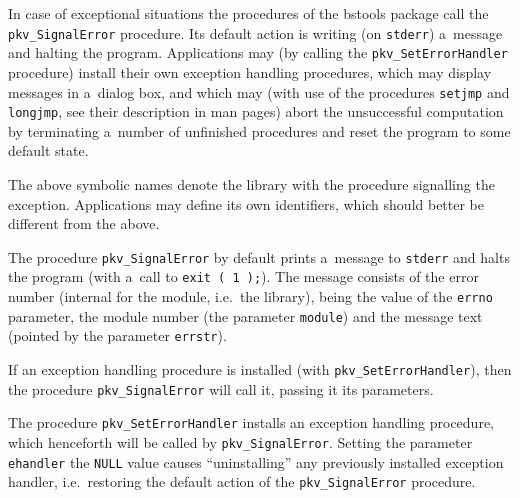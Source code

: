 In case of exceptional situations the procedures of the bstools package
call the \texttt{pkv\_SignalError} procedure. Its default action is
writing (on \texttt{stderr}) a~message and halting the program.
Applications may (by calling the \texttt{pkv\_SetErrorHandler} procedure)
install their own exception handling procedures, which may display
messages in a~dialog box, and which may (with use of the procedures
\texttt{setjmp} and \texttt{longjmp}, see their description in man pages)
abort the unsuccessful computation by terminating a~number of unfinished
procedures and reset the program to some default state.

\vspace{\bigskipamount}
The above symbolic names denote the library with the procedure signalling
the exception. Applications may define its own identifiers, which should
better be different from the above.

\vspace{\bigskipamount}
The procedure \texttt{pkv\_SignalError} by default prints a~message
to \texttt{stderr} and halts the program (with a~call to
\texttt{exit~(~1~);}). The message consists of the error number
(internal for the module, i.e.\ the library), being the value of
the \texttt{errno} parameter, the module number (the parameter
\texttt{module}) and the message text (pointed by the parameter
\texttt{errstr}).

If an exception handling procedure is installed (with
\texttt{pkv\_SetErrorHandler}), then the procedure
\texttt{pkv\_SignalError} will call it, passing it its parameters.

\vspace{\bigskipamount}
\begin{sloppypar}
The procedure \texttt{pkv\_SetErrorHandler} installs an exception handling
procedure, which henceforth will be called by \texttt{pkv\_SignalError}.
Setting the parameter \texttt{ehandler} the \texttt{NULL} value
causes ``uninstalling'' any previously installed exception handler,
i.e.\ restoring the default action of the \texttt{pkv\_SignalError}
procedure.%
\end{sloppypar}


